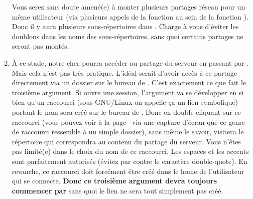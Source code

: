 \begin{enumerate}
Vous serez sans doute amené(e) à monter plusieurs partages réseau
pour un même utilisateur (via plusieurs appels de la fonction
 au sein de la fonction 
). Donc il y aura plusieurs sous-répertoires
dans . Charge à vous d'éviter les doublons
dans les noms des sous-répertoires, sans quoi certains partages ne
seront pas montés.


\item À ce stade, notre cher  pourra accéder au
partage  du serveur en passant par
. Mais cela n'est pas très pratique.
L'idéal serait d'avoir accès à ce partage directement via un dossier
sur le bureau de . C'est exactement ce que fait
le troisième argument. Si  ouvre
une session, l'argument 
va se développer en 
si bien qu'un raccourci (sous GNU/Linux on appelle ça un lien symbolique)
portant le nom 
sera créé sur le bureau de . Donc en double-cliquant sur
ce raccourci (vous pouvez voir à la page~\pageref{captureic} 
via une capture d'écran que ce
genre de raccourci ressemble à un simple dossier), sans même
le savoir,  visitera le répertoire
 qui correspondra au contenu du 
partage  du serveur. Vous n'êtes pas limité(e)
dans le choix du nom de ce raccourci. Les espaces et les accents
sont parfaitement autorisés (évitez par contre le caractère double-quote).
En revanche, ce raccourci doit forcément être créé dans le home
de l'utilisateur qui se connecte. \textbf{Donc ce troisième argument devra
toujours commencer par } sans quoi le lien
ne sera tout simplement pas créé.
\end{enumerate}


